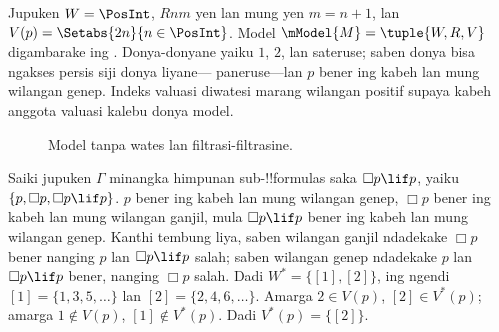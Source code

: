 \documentclass[../../../include/open-logic-section]{subfiles}
\begin{document}
\begin{ex}
  Jupuken $W = \PosInt$, $Rnm$ yen lan mung yen $m = n + 1$, lan
  $V(p) = \Setabs{2n}{n \in \PosInt}$. Model
  $\mModel{M} = \tuple{W, R, V}$ digambarake ing
  . Donya-donyane yaiku $1$, $2$, lan
  sateruse; saben donya bisa ngakses persis siji donya liyane---
  paneruse---lan $p$ bener ing kabeh lan mung wilangan genep. Indeks valuasi diwatesi marang wilangan positif supaya kabeh anggota valuasi kalebu donya model.

  \begin{figure}
    \centering

    \caption{Model tanpa wates lan filtrasi-filtrasine.}
  \end{figure}
  
  Saiki jupuken $\Gamma$ minangka himpunan sub-!!{formula}s saka
  $\Box p \lif p$, yaiku $\{p, \Box p, \Box p \lif p\}$. $p$ bener
  ing kabeh lan mung wilangan genep, $\Box p$ bener ing kabeh lan mung
  wilangan ganjil, mula $\Box p \lif p$ bener ing kabeh lan mung
  wilangan genep. Kanthi tembung liya, saben wilangan ganjil ndadekake
  $\Box p$ bener nanging $p$ lan $\Box p \lif p$ salah; saben wilangan
  genep ndadekake $p$ lan $\Box p \lif p$ bener, nanging $\Box p$
  salah. Dadi $W^* = \{ [1], [2] \}$, ing ngendi $[1] =
  \{1, 3, 5, \dots\}$ lan $[2] = \{2, 4, 6, \dots\}$. Amarga $2 \in
  V(p)$, $[2] \in V^*(p)$; amarga $1 \notin V(p)$, $[1] \notin
  V^*(p)$. Dadi $V^*(p) = \{[2]\}$.


\end{ex}
\end{document}
